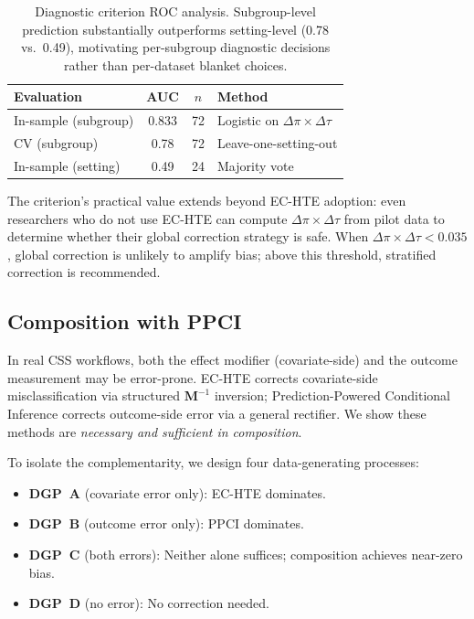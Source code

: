 \documentclass[11pt]{article}
\newcommand{\bM}{\mathbf{M}}
\newcommand{\dpi}{\Delta\pi}
\newcommand{\dtau}{\Delta\tau}
\begin{document}
\begin{table}[t]
\centering
\small
\begin{tabular}{lccl}
\toprule
Evaluation & AUC & $n$ & Method \\
\midrule
In-sample (subgroup) & 0.833 & 72 & Logistic on $\dpi \times \dtau$ \\
CV (subgroup) & 0.78 & 72 & Leave-one-setting-out \\
In-sample (setting) & 0.49 & 24 & Majority vote \\
\bottomrule
\end{tabular}
\caption{Diagnostic criterion ROC analysis. Subgroup-level prediction substantially outperforms setting-level (0.78 vs.\ 0.49), motivating per-subgroup diagnostic decisions rather than per-dataset blanket choices.}
\label{tab:diagnostic}
\end{table}

The criterion's practical value extends beyond EC-HTE adoption: even researchers who do not use EC-HTE can compute $\dpi \times \dtau$ from pilot data to determine whether their global correction strategy is safe.
When $\dpi \times \dtau < 0.035$, global correction is unlikely to amplify bias; above this threshold, stratified correction is recommended.

\subsection{Composition with PPCI}
\label{sec:ppci}

In real CSS workflows, both the effect modifier (covariate-side) and the outcome measurement may be error-prone.
EC-HTE corrects covariate-side misclassification via structured $\bM^{-1}$ inversion; Prediction-Powered Conditional Inference \cite[PPCI;][]{sui2026ppci} corrects outcome-side error via a general rectifier.
We show these methods are \emph{necessary and sufficient in composition}.

To isolate the complementarity, we design four data-generating processes:
\begin{itemize}[nosep,leftmargin=*]
\item \textbf{DGP~A} (covariate error only): EC-HTE dominates.
\item \textbf{DGP~B} (outcome error only): PPCI dominates.
\item \textbf{DGP~C} (both errors): Neither alone suffices; composition achieves near-zero bias.
\item \textbf{DGP~D} (no error): No correction needed.
\end{itemize}
\end{document}
